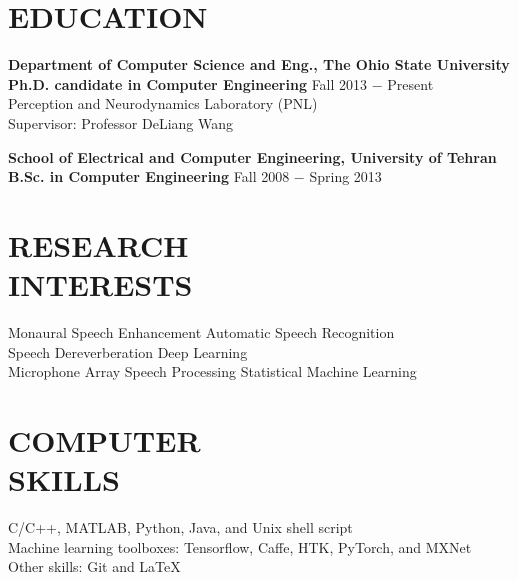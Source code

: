 \documentclass[margin, 10pt]{res}
\begin{document}
\begin{resume}

\section{EDUCATION}
\textbf{Department of Computer Science and Eng., The Ohio State University }  \\
\textbf{Ph.D. candidate in Computer Engineering} \hfill {\footnotesize Fall 2013 $-$ Present} \\
Perception and Neurodynamics Laboratory (PNL)\\
Supervisor: Professor DeLiang Wang

\textbf{School of Electrical and Computer Engineering, University of Tehran}\\
\textbf{B.Sc. in Computer Engineering} \hfill {\footnotesize Fall 2008 $-$ Spring 2013} 

\section{RESEARCH\\INTERESTS}
Monaural Speech Enhancement    \hspace{0.84in}   Automatic Speech Recognition\\ 
Speech Dereverberation     \hspace{1.32in}    Deep Learning\\ 
Microphone Array Speech Processing   \hspace{0.5in} Statistical Machine Learning

\section{COMPUTER \\ SKILLS}
C/C++, MATLAB, Python, Java, and Unix shell script\\
Machine learning toolboxes: Tensorflow,
Caffe, HTK, PyTorch, and MXNet\\
Other skills: Git and LaTeX


\end{resume}
\end{document}
